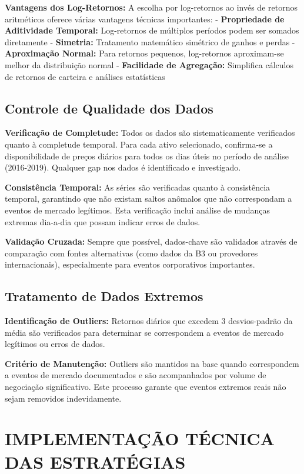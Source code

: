 \textbf{Vantagens dos Log-Retornos:} A escolha por log-retornos ao invés de retornos aritméticos oferece várias vantagens técnicas importantes:
- \textbf{Propriedade de Aditividade Temporal:} Log-retornos de múltiplos períodos podem ser somados diretamente
- \textbf{Simetria:} Tratamento matemático simétrico de ganhos e perdas
- \textbf{Aproximação Normal:} Para retornos pequenos, log-retornos aproximam-se melhor da distribuição normal
- \textbf{Facilidade de Agregação:} Simplifica cálculos de retornos de carteira e análises estatísticas

\subsection{Controle de Qualidade dos Dados}

\textbf{Verificação de Completude:} Todos os dados são sistematicamente verificados quanto à completude temporal. Para cada ativo selecionado, confirma-se a disponibilidade de preços diários para todos os dias úteis no período de análise (2016-2019). Qualquer gap nos dados é identificado e investigado.

\textbf{Consistência Temporal:} As séries são verificadas quanto à consistência temporal, garantindo que não existam saltos anômalos que não correspondam a eventos de mercado legítimos. Esta verificação inclui análise de mudanças extremas dia-a-dia que possam indicar erros de dados.

\textbf{Validação Cruzada:} Sempre que possível, dados-chave são validados através de comparação com fontes alternativas (como dados da B3 ou provedores internacionais), especialmente para eventos corporativos importantes.

\subsection{Tratamento de Dados Extremos}

\textbf{Identificação de Outliers:} Retornos diários que excedem 3 desvios-padrão da média são verificados para determinar se correspondem a eventos de mercado legítimos ou erros de dados.

\textbf{Critério de Manutenção:} Outliers são mantidos na base quando correspondem a eventos de mercado documentados e são acompanhados por volume de negociação significativo. Este processo garante que eventos extremos reais não sejam removidos indevidamente.

\section{IMPLEMENTAÇÃO TÉCNICA DAS ESTRATÉGIAS}

